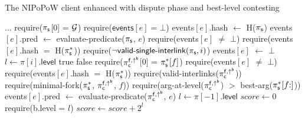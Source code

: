 \begin{algorithm}
    \caption{\label{alg:dispute-best-level}The \textsf{NIPoPoW} client enhanced
        with dispute phase and best-level contesting}

    \begin{algorithmic}[1]

    \State ...
        \State \textsf{require}($\mathsf{\pi_{s}}$[0] = $\mathcal{G}$)
        \State \textsf{require}($\textsf{events$[e]$} = \bot$)
        \State \textsf{events$[e]$.hash} $\gets$ \textsf{H}($\mathsf{\pi_{s}}$)
        \State \textsf{events$[e]$.pred} $\gets$
        \textsf{evaluate-predicate}(\textsf{$\mathsf{\pi_{s}}$}, $e$)
    \EndFunction
        \State \textsf{require}(\textsf{events}$[e]$ $\ne$ $\bot$)
        \State \textsf{require}(\textsf{events$[e]$.hash} $=$ \textsf{H}($\mathsf{\pi_{s}^*}$))
        \State \textsf{require}($\neg \textsf{valid-single-interlink}(\mathsf{\pi_{s}}, i)$)
        \State \textsf{events$[e]$} $\gets$ $\bot$
    \EndFunction
        \State $l\gets\pi[i].\mathsf{level}$
        \State \Return true
        \EndIf
        \State \Return false
    \EndFunction
        \State \textsf{require}($\mathsf{\pi_{c}^{f, \uparrow^{b}}}$[0] = $\mathsf{\pi_{s}^*}[f]$)
        \State \textsf{require}(\textsf{events}$[e]$ $\ne$ $\bot$)
        \State \textsf{require}(\textsf{events$[e]$.hash} $=$ \textsf{H}($\mathsf{\pi_{s}^*}$))
        \State \textsf{require}(\textsf{valid-interlinks}($\mathsf{\pi_{c}^{f, \uparrow^{b}}}$))
        \State \textsf{require}(\textsf{minimal-fork}($\mathsf{\pi_{s}^*}$,
        $\mathsf{\pi_{c}^{f, \uparrow^{b}}}$, $f$))
        \State \textsf{require}(\textsf{arg-at-level}($\mathsf{\pi_{c}^{f, \uparrow^{b}}}$)
        $>$ \textsf{best-arg}($\mathsf{\pi_{s}^*}[f{:}]$))
        \State \textsf{events$[e]$.pred} $\gets$
            \textsf{evaluate-predicate}($\mathsf{\pi_{c}^{f, \uparrow^{b}}}$, $e$)
    \EndFunction
        \State $l \gets \pi[-1].\textsf{level}$
        \State $score \gets 0$
            \State \textsf{require}(b.\textsf{level} = $l$)
            \State $score \gets score {+} 2^l$
        \EndFor
        \State {}
    \EndFunction
    \EndContract
    \vskip8pt
    \end{algorithmic}
\end{algorithm}

